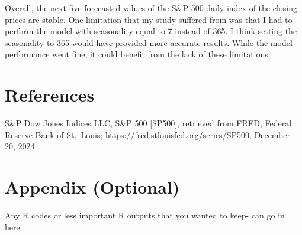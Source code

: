 \documentclass[
  man]{apa6}
\begin{document}
Overall, the next five forecasted values of the S\&P 500 daily index of the closing prices are stable. One limitation that my study suffered from was that I had to perform the model with seasonality equal to 7 instead of 365. I think setting the seasonality to 365 would have provided more accurate results. While the model performance went fine, it could benefit from the lack of these limitations.

\newpage

\section{References}\label{references}

S\&P Dow Jones Indices LLC, S\&P 500 {[}SP500{]}, retrieved from FRED, Federal Reserve Bank of St.~Louis; \url{https://fred.stlouisfed.org/series/SP500}, December 20, 2024.

\section{Appendix (Optional)}\label{appendix-optional}

Any R codes or less important R outputs that you wanted to keep- can go in here.
\end{document}
